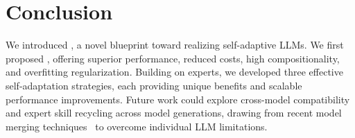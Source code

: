 \section{Conclusion}
\label{sec:conclusion}
\vspace{-2mm}

We introduced \implname, a novel blueprint toward realizing self-adaptive LLMs. 
We first proposed \svdacro, offering superior performance, reduced costs, high compositionality, and overfitting regularization. 
Building on \svdacro experts, we developed three effective self-adaptation strategies, each providing unique benefits and scalable performance improvements. 
Future work could explore cross-model compatibility and expert skill recycling across model generations, drawing from recent model merging techniques~\citep{yu2024language,goddard2024arcee,akiba2024evolutionary} to overcome individual LLM limitations.